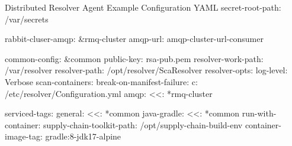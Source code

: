 
\label{code:agent-yaml-example}
\begin{code}{Distributed Resolver Agent Example Configuration YAML}{}{}
secret-root-path: /var/secrets

rabbit-cluser-amqp: &rmq-cluster
  amqp-url: amqp-cluster-url-consumer

common-config: &common
    public-key: rsa-pub.pem
    resolver-work-path: /var/resolver
    resolver-path: /opt/resolver/ScaResolver
    resolver-opts:
      log-level: Verbose
      scan-containers:
      break-on-manifest-failure:
      c: /etc/resolver/Configuration.yml
    amqp:
      <<: *rmq-cluster

serviced-tags:
  general:
    <<: *common
  java-gradle:
    <<: *common
    run-with-container:
      supply-chain-toolkit-path: /opt/supply-chain-build-env
      container-image-tag: gradle:8-jdk17-alpine
\end{code}